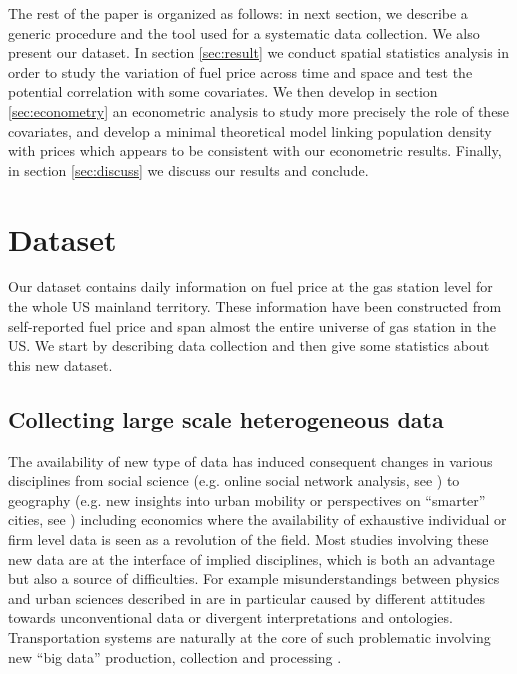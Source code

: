 \documentclass[10pt]{article}
\begin{document}
The rest of the paper is organized as follows: in next section, we describe a generic procedure and the tool used for a systematic data collection. We also present our dataset. In section \ref{sec:result} we conduct spatial statistics analysis in order to study the variation of fuel price across time and space and test the potential correlation with some covariates. We then develop in section \ref{sec:econometry} an econometric analysis to study more precisely the role of these covariates, and develop a minimal theoretical model linking population density with prices which appears to be consistent with our econometric results. Finally, in section \ref{sec:discuss} we discuss our results and conclude.



\section{Dataset} \label{sec:data}

Our dataset contains daily information on fuel price at the gas station level for the whole US mainland territory. These information have been constructed from self-reported fuel price and span almost the entire universe of gas station in the US. We start by describing data collection and then give some statistics about this new dataset.

\subsection{Collecting large scale heterogeneous data}

The availability of new type of data has induced consequent changes in various disciplines from social science (e.g. online social network analysis, see \citealp{tan2013social}) to geography (e.g. new insights into urban mobility or perspectives on ``smarter'' cities, see \citealp{batty2013big}) including economics where the availability of exhaustive individual or firm level data is seen as a revolution of the field. Most studies involving these new data are at the interface of implied disciplines, which is both an advantage but also a source of difficulties. For example misunderstandings between physics and urban sciences described in \cite{dupuy2015sciences} are in particular caused by different attitudes towards unconventional data or divergent interpretations and ontologies. Transportation systems are naturally at the core of such problematic involving new ``big data'' production, collection and processing \citep{kitchin2014real}.
\end{document}
